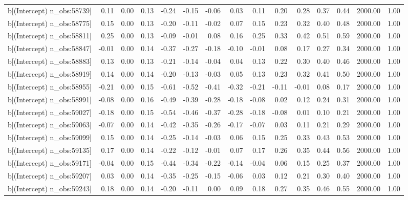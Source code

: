 \begin{table}[ht]
\begin{tabular}{rrrrrrrrrrrrrrr}
  b[(Intercept) n\_obs:58739] & 0.11 & 0.00 & 0.13 & -0.24 & -0.15 & -0.06 & 0.03 & 0.11 & 0.20 & 0.28 & 0.37 & 0.44 & 2000.00 & 1.00 \\ 
  b[(Intercept) n\_obs:58775] & 0.15 & 0.00 & 0.13 & -0.20 & -0.11 & -0.02 & 0.07 & 0.15 & 0.23 & 0.32 & 0.40 & 0.48 & 2000.00 & 1.00 \\ 
  b[(Intercept) n\_obs:58811] & 0.25 & 0.00 & 0.13 & -0.09 & -0.01 & 0.08 & 0.16 & 0.25 & 0.33 & 0.42 & 0.51 & 0.59 & 2000.00 & 1.00 \\ 
  b[(Intercept) n\_obs:58847] & -0.01 & 0.00 & 0.14 & -0.37 & -0.27 & -0.18 & -0.10 & -0.01 & 0.08 & 0.17 & 0.27 & 0.34 & 2000.00 & 1.00 \\ 
  b[(Intercept) n\_obs:58883] & 0.13 & 0.00 & 0.13 & -0.21 & -0.14 & -0.04 & 0.04 & 0.13 & 0.22 & 0.30 & 0.40 & 0.46 & 2000.00 & 1.00 \\ 
  b[(Intercept) n\_obs:58919] & 0.14 & 0.00 & 0.14 & -0.20 & -0.13 & -0.03 & 0.05 & 0.13 & 0.23 & 0.32 & 0.41 & 0.50 & 2000.00 & 1.00 \\ 
  b[(Intercept) n\_obs:58955] & -0.21 & 0.00 & 0.15 & -0.61 & -0.52 & -0.41 & -0.32 & -0.21 & -0.11 & -0.01 & 0.08 & 0.17 & 2000.00 & 1.00 \\ 
  b[(Intercept) n\_obs:58991] & -0.08 & 0.00 & 0.16 & -0.49 & -0.39 & -0.28 & -0.18 & -0.08 & 0.02 & 0.12 & 0.24 & 0.31 & 2000.00 & 1.00 \\ 
  b[(Intercept) n\_obs:59027] & -0.18 & 0.00 & 0.15 & -0.54 & -0.46 & -0.37 & -0.28 & -0.18 & -0.08 & 0.01 & 0.10 & 0.21 & 2000.00 & 1.00 \\ 
  b[(Intercept) n\_obs:59063] & -0.07 & 0.00 & 0.14 & -0.42 & -0.35 & -0.26 & -0.17 & -0.07 & 0.03 & 0.11 & 0.21 & 0.29 & 2000.00 & 1.00 \\ 
  b[(Intercept) n\_obs:59099] & 0.15 & 0.00 & 0.14 & -0.25 & -0.14 & -0.03 & 0.06 & 0.15 & 0.25 & 0.33 & 0.43 & 0.53 & 2000.00 & 1.00 \\ 
  b[(Intercept) n\_obs:59135] & 0.17 & 0.00 & 0.14 & -0.22 & -0.12 & -0.01 & 0.07 & 0.17 & 0.26 & 0.35 & 0.44 & 0.56 & 2000.00 & 1.00 \\ 
  b[(Intercept) n\_obs:59171] & -0.04 & 0.00 & 0.15 & -0.44 & -0.34 & -0.22 & -0.14 & -0.04 & 0.06 & 0.15 & 0.25 & 0.37 & 2000.00 & 1.00 \\ 
  b[(Intercept) n\_obs:59207] & 0.03 & 0.00 & 0.14 & -0.35 & -0.25 & -0.15 & -0.06 & 0.03 & 0.12 & 0.21 & 0.30 & 0.40 & 2000.00 & 1.00 \\ 
  b[(Intercept) n\_obs:59243] & 0.18 & 0.00 & 0.14 & -0.20 & -0.11 & 0.00 & 0.09 & 0.18 & 0.27 & 0.35 & 0.46 & 0.55 & 2000.00 & 1.00 \\ 

\end{tabular}
\end{table}
